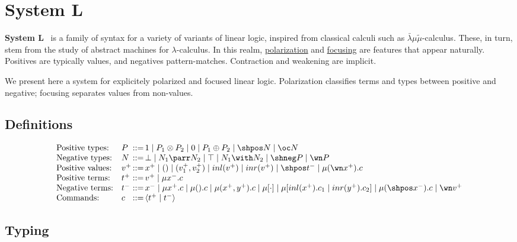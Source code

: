 \chapter{System L}\label{system-l}

\textbf{System L}~\cite{dualitycomputationfocus} is a family of syntax for a variety of variants of
linear logic, inspired from classical calculi such as
\(\bar\lambda\mu\tilde\mu\)-calculus. These, in turn, stem from the
study of abstract machines for \(\lambda\)-calculus. In this realm,
\hyperref[polarized-linear-logic]{polarization} and \hyperref[reversibility-and-focusing]{focusing} are
features that appear naturally. Positives are typically values, and
negatives pattern-matches. Contraction and weakening are implicit.

We present here a system for explicitely polarized and focused linear
logic. Polarization classifies terms and types between positive and
negative; focusing separates values from non-values.

\section{Definitions}\label{definitions}

\begin{equation*}
\begin{array}{ll@{\,}l@{\,}l}
\text{Positive types:} & P & ::= & 1 \mid P_1 \otimes P_2 \mid 0 \mid P_1 \oplus P_2 \mid \shpos N \mid \oc N \\
\text{Negative types:} & N & ::= & \bot \mid N_1 \parr N_2 \mid \top \mid N_1 \with N_2 \mid \shneg P \mid \wn P \\
\text{Positive values:} & v^+ & ::= & x^+ \mid () \mid (v_1^+, v_2^+) \mid inl(v^+) \mid inr(v^+) \mid \shpos t^- \mid \mu(\wn x^+).c \\
\text{Positive terms:} & t^+ & ::= & v^+ \mid \mu x^-.c \\
\text{Negative terms:} & t^- & ::= & x^- \mid \mu x^+.c \mid \mu().c \mid \mu(x^+, y^+).c \mid \mu [\cdot] \mid \mu[inl(x^+).c_1 \mid inr(y^+).c_2] \mid \mu(\shpos x^-).c \mid \wn v^+ \\
\text{Commands:} & c & ::= & \langle t^+ \mid t^- \rangle
\end{array}
\end{equation*}
\section{Typing}\label{typing}

